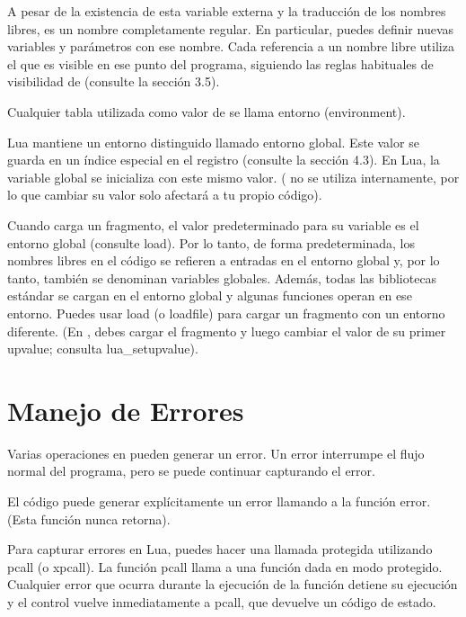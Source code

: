 A pesar de la existencia de esta variable externa  y la traducción de los nombres libres,   es un nombre completamente regular. En particular, puedes definir nuevas variables y parámetros con ese nombre. Cada referencia a un nombre libre utiliza el  que es visible en ese punto del programa, siguiendo las reglas habituales de visibilidad de  (consulte la sección 3.5).

Cualquier tabla utilizada como valor de  se llama entorno (environment).

Lua mantiene un entorno distinguido llamado entorno global. Este valor se guarda en un índice especial en el registro  (consulte la sección 4.3). En Lua, la variable global  se inicializa con este mismo valor. ( no se utiliza internamente, por lo que cambiar su valor solo afectará a tu propio código).

Cuando  carga un fragmento, el valor predeterminado para su variable  es el entorno global (consulte load). Por lo tanto, de forma predeterminada, los nombres libres en el código  se refieren a entradas en el entorno global y, por lo tanto, también se denominan variables globales. Además, todas las bibliotecas estándar se cargan en el entorno global y algunas funciones operan en ese entorno. Puedes usar load (o loadfile) para cargar un fragmento con un entorno diferente. (En , debes cargar el fragmento y luego cambiar el valor de su primer upvalue; consulta lua\_setupvalue).

\section{Manejo de Errores}

Varias operaciones en  pueden generar un error. Un error interrumpe el flujo normal del programa, pero se puede continuar capturando el error.

El código  puede generar explícitamente un error llamando a la función error. (Esta función nunca retorna).

Para capturar errores en Lua, puedes hacer una llamada protegida utilizando pcall (o xpcall). La función pcall llama a una función dada en modo protegido. Cualquier error que ocurra durante la ejecución de la función detiene su ejecución y el control vuelve inmediatamente a pcall, que devuelve un código de estado.

